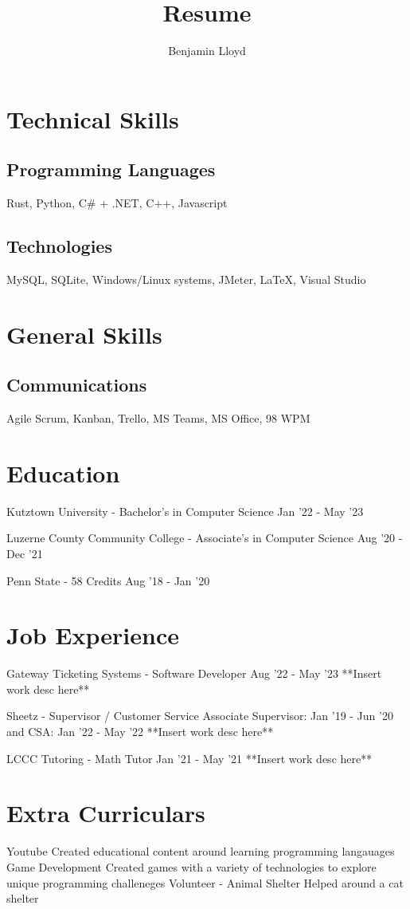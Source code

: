 \documentclass{atricle}
\begin{document}
\title{Resume}
\author{Benjamin Lloyd}

\maketitle

\section{Technical Skills}

\subsection{Programming Languages}
Rust, Python, C# + .NET, C++, Javascript

\subsection{Technologies}
MySQL, SQLite, Windows/Linux systems, JMeter, {\LaTeX}, Visual Studio

\section{General Skills}

\subsection{Communications}
Agile Scrum, Kanban, Trello, MS Teams, MS Office, 98 WPM

\section{Education}
Kutztown University - Bachelor's in Computer Science
Jan '22 - May '23

Luzerne County Community College - Associate's in Computer Science
Aug '20 - Dec '21

Penn State - 58 Credits
Aug '18 - Jan '20

\section{Job Experience}
Gateway Ticketing Systems - Software Developer
Aug '22 - May '23
**Insert work desc here**

Sheetz - Supervisor / Customer Service Associate
Supervisor: Jan '19 - Jun '20 and CSA: Jan '22 - May '22
**Insert work desc here**

LCCC Tutoring - Math Tutor
Jan '21 - May '21
**Insert work desc here**

\section{Extra Curriculars}
Youtube
  Created educational content around learning programming langauages
Game Development
  Created games with a variety of technologies to explore unique programming challeneges
Volunteer - Animal Shelter
  Helped around a cat shelter
\end{document}
